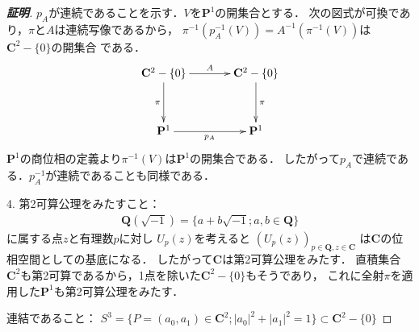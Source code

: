 \documentclass[11pt, a4paper, dvipdfmx, draft]{jsarticle}
\theoremstyle{definition}
\newcommand{\qq}{\mathbf{Q}}
\newcommand{\cc}{\mathbf{C}}
\newcommand{\pp}{\mathbf{P}}
\theoremstyle{mystyle}
\begin{document}
\begin{proof}[\textbf{証明}]
    $p_A$が連続であることを示す．$V$を$\pp^1$の開集合とする．
    次の図式が可換であり，$\pi$と$A$は連続写像であるから，
    $\pi^{-1}\left(p_A^{-1}(V)\right)
    =A^{-1}\left(\pi^{-1}(V)\right)$は$\cc^2-\{0\}$の開集合
    である．
    \begin{equation*}
        \vcenter{\xymatrix@C=36pt@R=36pt{
        \cc^2-\{0\} 
        \ar@{{}->}[d]_{\pi} 
        \ar@{{}->}[r]^-{A} 
        & \cc^2-\{0\} 
        \ar@{{}->}[d]^{\pi} 
        \\
        \pp^1 \ar[r]_{p_A}  
        & \pp^1 \ar@{}[lu]
        }}
    \end{equation*}
    $\pp^{1}$の商位相の定義より$\pi^{-1}(V)$は$\pp^{1}$の開集合である．
    したがって$p_A$で連続である．$p_A^{-1}$が連続であることも同様である．

    4. 
    第2可算公理をみたすこと：
    \begin{align*}
        \qq(\sqrt{-1})=\{a+b\sqrt{-1};a,b\in\qq\}
    \end{align*}
    に属する点$z$と有理数$p$に対し
    $U_{p}(z)$を考えると
    $\left(U_{p}(z)\right)_{p\in\qq,z\in\cc}$
    は$\cc$の位相空間としての基底になる．
    したがって$\cc$は第2可算公理をみたす．
    直積集合$\cc^2$も第2可算であるから，1点を除いた$\cc^2-\{0\}$もそうであり，
    これに全射$\pi$を適用した$\pp^1$も第2可算公理をみたす．

    連結であること：
    $S^3=\{P=(a_0,a_1)\in\cc^2;|a_0|^2+|a_1|^2=1\}\subset\cc^2-\{0\}$
\end{proof}
\end{document}
